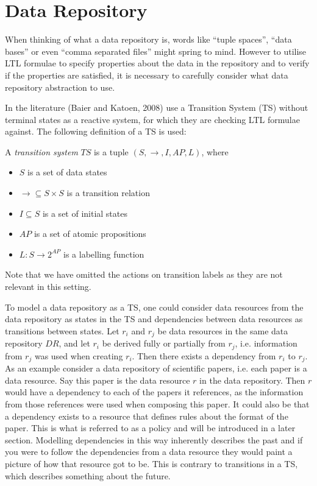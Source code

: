 \section{Data Repository}\label{sec:data-repository}
When thinking of what a data repository is, words like ``tuple spaces'', ``data bases'' or even ``comma separated files'' might spring to mind. However to utilise LTL formulae to specify properties about the data in the repository and to verify if the properties are satisfied, it is necessary to carefully consider what data repository abstraction to use. 

In the literature (Baier and Katoen, 2008)\cite{baier2008principles} use a Transition System (TS) without terminal states as a reactive system, for which they are checking LTL formulae against. The following definition of a TS is used:
\begin{definition}\label{def:ts}
A \emph{transition system} $TS$ is a tuple $\left(S, \longrightarrow, I, AP, L \right)$, where
\begin{itemize}
  \item $S$ is a set of data states
  \item $\longrightarrow \subseteq S \times S$ is a transition relation
  \item $I \subseteq S$ is a set of initial states
  \item $AP$ is a set of atomic propositions
  \item $L : S \rightarrow 2^{AP}$ is a labelling function
\end{itemize}
Note that we have omitted the actions on transition labels as they are not relevant in this setting.
\end{definition}

To model a data repository as a TS, one could consider data resources from the data repository as states in the TS and dependencies between data resources as transitions between states. Let $r_i$ and $r_j$ be data resources in the same data repository $DR$, and let $r_i$ be derived fully or partially from $r_j$, i.e. information from $r_j$ was used when creating $r_i$. Then there exists a dependency from $r_i$ to $r_j$. As an example consider a data repository of scientific papers, i.e. each paper is a data resource. Say this paper is the data resource $r$ in the data repository. Then $r$ would have a dependency to each of the papers it references, as the information from those references were used when composing this paper. It could also be that a dependency exists to a resource that defines rules about the format of the paper. This is what is referred to as a policy and will be introduced in a later section. Modelling dependencies in this way inherently describes the past and if you were to follow the dependencies from a data resource they would paint a picture of how that resource got to be. This is contrary to transitions in a TS, which describes something about the future.


